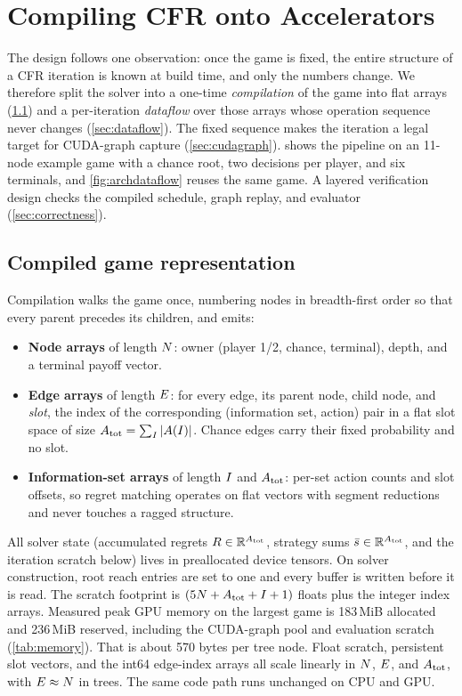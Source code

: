 \section{Compiling CFR onto Accelerators}
\label{sec:method}

The design follows one observation: once the game is fixed, the entire structure of
a CFR iteration is known at build time, and only the numbers change. We therefore split the solver into a one-time \emph{compilation} of the game into
flat arrays (\cref{sec:compiled}) and a per-iteration \emph{dataflow} over those
arrays whose operation sequence never changes (\cref{sec:dataflow}). The fixed
sequence makes the iteration a legal target for CUDA-graph capture
(\cref{sec:cudagraph}).  shows the pipeline on an 11-node
example game with a chance root, two decisions per player, and six terminals, and
\cref{fig:archdataflow} reuses the same game. A layered verification design checks
the compiled schedule, graph replay, and evaluator (\cref{sec:correctness}).



\subsection{Compiled game representation}
\label{sec:compiled}

Compilation walks the game once, numbering nodes in breadth-first order so that
every parent precedes its children, and emits:
\begin{itemize}
    \item \textbf{Node arrays} of length $N$: owner (player 1/2, chance,
    terminal), depth, and a terminal payoff vector.
    \item \textbf{Edge arrays} of length $E$: for every edge, its parent node,
    child node, and \emph{slot}, the index of the corresponding (information set,
    action) pair in a flat slot space of size $A_{\mathrm{tot}} = \sum_{I} |A(I)|$.
    Chance edges carry their fixed probability and no slot.
    \item \textbf{Information-set arrays} of length $I$ and $A_{\mathrm{tot}}$:
    per-set action counts and slot offsets, so regret matching operates on flat
    vectors with segment reductions and never touches a ragged structure.
\end{itemize}
All solver state (accumulated regrets $R \in \mathbb{R}^{A_{\mathrm{tot}}}$, strategy sums
$\bar{s} \in \mathbb{R}^{A_{\mathrm{tot}}}$, and the iteration scratch below) lives in
preallocated device tensors. On solver construction, root reach entries are set to
one and every buffer is written before it is read. The scratch footprint is
$(5N + A_{\mathrm{tot}} + I + 1)$ floats plus the integer index arrays.
Measured peak GPU memory on the largest game is 183\,MiB allocated and 236\,MiB
reserved, including the CUDA-graph pool and evaluation scratch (\cref{tab:memory}).
That is about 570 bytes per tree node. Float scratch, persistent slot vectors, and
the int64 edge-index arrays all scale linearly in $N$, $E$, and
$A_{\mathrm{tot}}$, with $E \approx N$ in trees. The same code path runs
unchanged on CPU and GPU.

